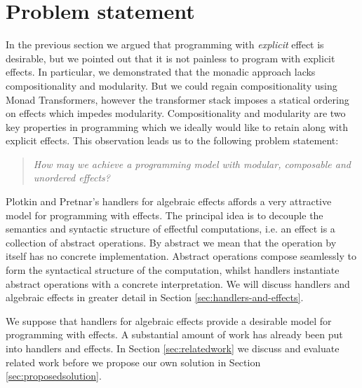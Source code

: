 \section{Problem statement}
In the previous section we argued that programming with \emph{explicit} effect is desirable, but we pointed out that it is not painless to program with explicit effects. In particular, we demonstrated that the monadic approach lacks compositionality and modularity. But we could regain compositionality using Monad Transformers, however the transformer stack imposes a statical ordering on effects which impedes modularity. Compositionality and modularity are two key properties in programming which we ideally would like to retain along with explicit effects. This observation leads us to the following problem statement:
\begin{quote}
  \emph{How may we achieve a programming model with modular, composable and unordered effects?}
\end{quote}
Plotkin and Pretnar's handlers for algebraic effects \cite{Plotkin2013} affords a very attractive model for programming with effects. The principal idea is to decouple the semantics and syntactic structure of effectful computations, i.e. an effect is a collection of abstract operations. By abstract we mean that the operation by itself has no concrete implementation. Abstract operations compose seamlessly to form the syntactical structure of the computation, whilst handlers instantiate abstract operations with a concrete interpretation. We will discuss handlers and algebraic effects in greater detail in Section \ref{sec:handlers-and-effects}.

We suppose that handlers for algebraic effects provide a desirable model for programming with effects. A substantial amount of work has already been put into handlers and effects. In Section \ref{sec:relatedwork} we discuss and evaluate related work before we propose our own solution in Section \ref{sec:proposedsolution}.
